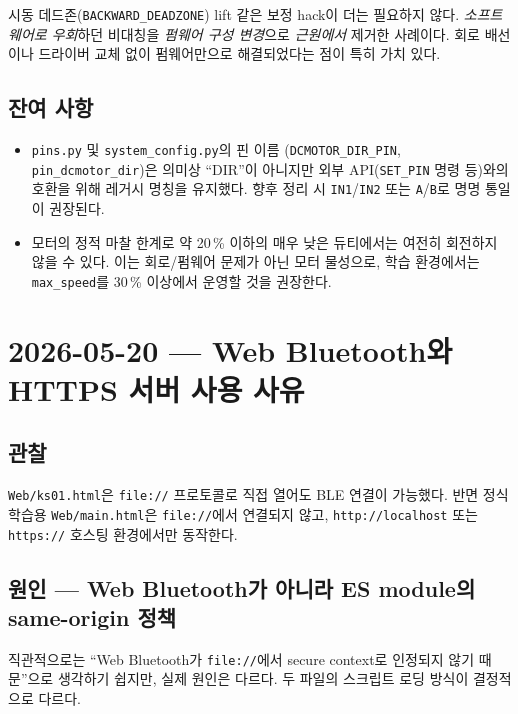 \documentclass[11pt, oneside]{article}
\begin{document}
\begin{keypoint}
시동 데드존(\texttt{BACKWARD\_DEADZONE}) lift 같은 보정 hack이 더는
필요하지 않다. \emph{소프트웨어로 우회}하던 비대칭을 \emph{펌웨어
구성 변경}으로 \emph{근원에서} 제거한 사례이다. 회로 배선이나 드라이버
교체 없이 펌웨어만으로 해결되었다는 점이 특히 가치 있다.
\end{keypoint}

\subsection{잔여 사항}

\begin{itemize}
  \item \texttt{pins.py} 및 \texttt{system\_config.py}의 핀 이름
        (\texttt{DCMOTOR\_DIR\_PIN}, \texttt{pin\_dcmotor\_dir})은
        의미상 ``DIR''이 아니지만 외부 API(\texttt{SET\_PIN} 명령
        등)와의 호환을 위해 레거시 명칭을 유지했다. 향후 정리 시
        \texttt{IN1}/\texttt{IN2} 또는 \texttt{A}/\texttt{B}로
        명명 통일이 권장된다.
  \item 모터의 정적 마찰 한계로 약 20\,\% 이하의 매우 낮은 듀티에서는
        여전히 회전하지 않을 수 있다. 이는 회로/펌웨어 문제가 아닌
        모터 물성으로, 학습 환경에서는 \texttt{max\_speed}를 30\,\%
        이상에서 운영할 것을 권장한다.
\end{itemize}

\section{2026-05-20 --- Web Bluetooth와 HTTPS 서버 사용 사유}

\subsection{관찰}

\texttt{Web/ks01.html}은 \texttt{file://} 프로토콜로 직접 열어도 BLE
연결이 가능했다. 반면 정식 학습용 \texttt{Web/main.html}은
\texttt{file://}에서 연결되지 않고, \texttt{http://localhost} 또는
\texttt{https://} 호스팅 환경에서만 동작한다.

\subsection{원인 --- Web Bluetooth가 아니라 ES module의 same-origin 정책}

직관적으로는 ``Web Bluetooth가 \texttt{file://}에서 secure context로
인정되지 않기 때문''으로 생각하기 쉽지만, 실제 원인은 다르다. 두
파일의 스크립트 로딩 방식이 결정적으로 다르다.
\end{document}
